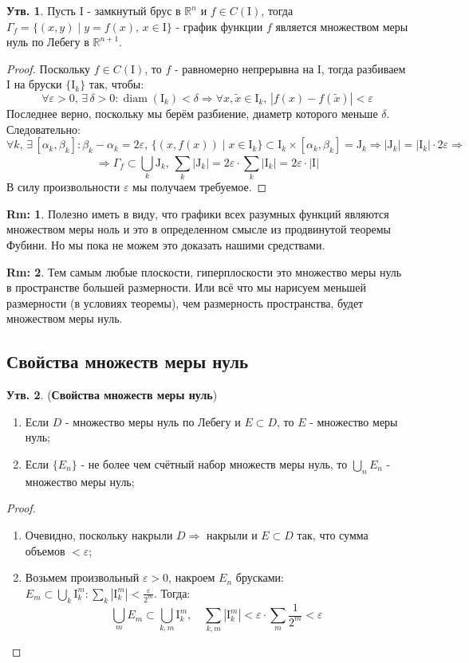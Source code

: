\documentclass[12pt]{article}
\newcommand{\MR}{\mathbb{R}}
\newcommand{\MI}{\mathrm{I}}
\newcommand{\MJ}{\mathrm{J}}
\newcommand{\VE}{\varepsilon}
\theoremstyle{definition}
\newtheorem{rem}{Rm:}
\newtheorem{prop}{Утв.}
\DeclareMathOperator{\diam}{\text{diam}}
\newcommand{\ddsum}[2]{\displaystyle\sum\limits_{#1}^{#2}}
\newcommand{\wte}[1]{\widetilde{#1}}
\begin{document}
\begin{prop}
	Пусть $\MI$ - замкнутый брус в $\MR^n$ и $f\in C(\MI)$, тогда $\Gamma_f = \{(x,y) \mid y = f(x), \, x \in \MI\}$ - график функции $f$ является множеством меры нуль по Лебегу в $\MR^{n+1}$.
\end{prop}
\begin{proof}
	Поскольку $f \in C(\MI)$, то $f$ - равномерно непрерывна на $\MI$, тогда разбиваем $\MI$ на бруски $\{\MI_k\}$ так, чтобы:
	$$
		\forall \VE > 0, \, \exists \, \delta > 0 \colon \diam(\MI_k) < \delta \Rightarrow \forall x, \wte{x} \in \MI_k, \, |f(x) - f(\wte{x})| < \VE
	$$
	Последнее верно, поскольку мы берём разбиение, диаметр которого меньше $\delta$. Следовательно:
	$$
		\forall k, \, \exists \, [\alpha_k,\beta_k] \colon \beta_k - \alpha_k = 2\VE, \, \{(x,f(x)) \mid x \in \MI_k\} \subset \MI_k \times [\alpha_k, \beta_k] = \MJ_k \Rightarrow |\MJ_k| = |\MI_k|{\cdot}2\VE \Rightarrow
	$$
	$$
		\Rightarrow \Gamma_f \subset \bigcup\limits_k \MJ_k, \, \ddsum{k}{}|\MJ_k| = 2\VE{\cdot}\ddsum{k}{}|\MI_k| = 2\VE{\cdot}|\MI|
	$$
	В силу произвольности $\VE$ мы получаем требуемое.
\end{proof}
\begin{rem}
	Полезно иметь в виду, что графики всех разумных функций являются множеством меры ноль и это в определенном смысле из продвинутой теоремы Фубини. Но мы пока не можем это доказать нашими средствами.
\end{rem}
\begin{rem}
	Тем самым любые плоскости, гиперплоскости это множество меры нуль в пространстве большей размерности. Или всё что мы нарисуем меньшей размерности (в условиях теоремы), чем размерность пространства, будет множеством меры нуль.
\end{rem}

\subsection*{Свойства множеств меры нуль}
\begin{prop}(\textbf{Свойства множеств меры нуль})\hfill
	\begin{enumerate}[label=\arabic*)]
		\item Если $D$ - множество меры нуль по Лебегу и $E \subset D$, то $E$ - множество меры нуль;
		\item Если $\{E_n\}$ - не более чем счётный набор множеств меры нуль, то $\bigcup_n E_n$ - множество меры нуль;
	\end{enumerate}
\end{prop}
\begin{proof}\hfill
	\begin{enumerate}[label=\arabic*)]
		\item Очевидно, поскольку накрыли $D \Rightarrow$ накрыли и $E \subset D$ так, что сумма объемов $< \VE$;
		\item Возьмем произвольный $\VE > 0$, накроем $E_n$ брусками: $E_m \subset \bigcup_k \MI_k^m \colon \sum_k |\MI_k^m| < \tfrac{\VE}{2^m}$. Тогда:
		$$
			\bigcup_m E_m \subset \bigcup_{k,m} \MI_k^m, \quad \ddsum{k,m}{}|\MI_k^m| < \VE{\cdot}\ddsum{m}{}\dfrac{1}{2^m} < \VE 
		$$
	\end{enumerate}	
\end{proof}
\end{document}
